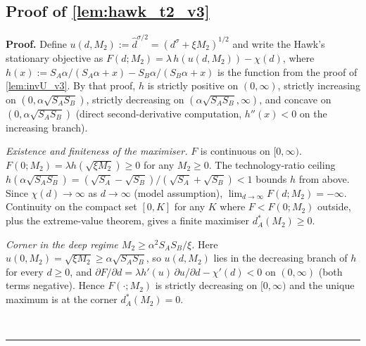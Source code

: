 \documentclass[11pt,twoside]{extarticle}
\newenvironment{proof}[1][Proof]{\noindent \textbf{#1.} }{\ \rule{0.5em}{0.5em}}
\begin{document}
\subsection*{Proof of \autoref{lem:hawk_t2_v3}} \label{app:proof:hawk_t2_v3}
\begin{proof}
Define $u(d,M_2):=\hat d^{\sigma/2}=(d^\sigma+\xi M_2)^{1/2}$ and write the Hawk's stationary objective as $F(d;M_2)=\lambda\,h(u(d,M_2))-\chi(d)$, where $h(x):=S_A\alpha/(S_A\alpha+x)-S_B\alpha/(S_B\alpha+x)$ is the function from the proof of \autoref{lem:invU_v3}. By that proof, $h$ is strictly positive on $(0,\infty)$, strictly increasing on $(0,\alpha\sqrt{S_A S_B})$, strictly decreasing on $(\alpha\sqrt{S_A S_B},\infty)$, and concave on $(0,\alpha\sqrt{S_A S_B})$ (direct second-derivative computation, $h''(x)<0$ on the increasing branch).

\emph{Existence and finiteness of the maximiser.} $F$ is continuous on $[0,\infty)$. $F(0;M_2)=\lambda h(\sqrt{\xi M_2})\ge 0$ for any $M_2\ge 0$. The technology-ratio ceiling $h(\alpha\sqrt{S_A S_B})=(\sqrt{S_A}-\sqrt{S_B})/(\sqrt{S_A}+\sqrt{S_B})<1$ bounds $h$ from above. Since $\chi(d)\to\infty$ as $d\to\infty$ (model assumption), $\lim_{d\to\infty}F(d;M_2)=-\infty$. Continuity on the compact set $[0,K]$ for any $K$ where $F<F(0;M_2)$ outside, plus the extreme-value theorem, gives a finite maximiser $d_A^*(M_2)\ge 0$.

\emph{Corner in the deep regime $M_2\ge\alpha^2 S_A S_B/\xi$.} Here $u(0,M_2)=\sqrt{\xi M_2}\ge\alpha\sqrt{S_A S_B}$, so $u(d,M_2)$ lies in the decreasing branch of $h$ for every $d\ge 0$, and $\partial F/\partial d=\lambda h'(u)\,\partial u/\partial d-\chi'(d)<0$ on $(0,\infty)$ (both terms negative). Hence $F(\cdot;M_2)$ is strictly decreasing on $[0,\infty)$ and the unique maximum is at the corner $d_A^*(M_2)=0$.


\end{proof}
\end{document}
